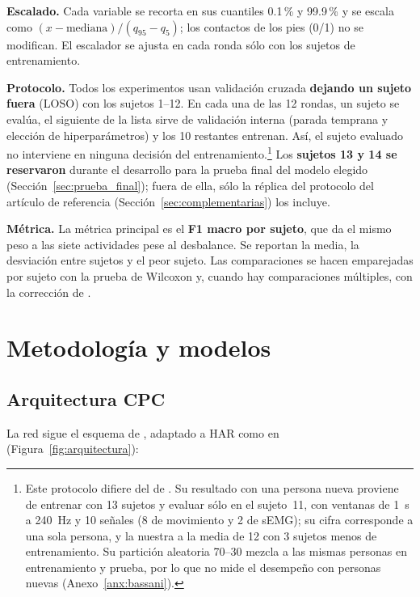 \documentclass[letterpaper,11pt]{article}
\begin{document}
\textbf{Escalado.} Cada variable se recorta en sus cuantiles 0.1\,\% y 99.9\,\% y se escala como $(x - \text{mediana})/(q_{95} - q_{5})$; los contactos de los pies (0/1) no se modifican. El escalador se ajusta en cada ronda sólo con los sujetos de entrenamiento.

\textbf{Protocolo.} Todos los experimentos usan validación cruzada \textbf{dejando un sujeto fuera} (LOSO) con los sujetos 1--12. En cada una de las 12 rondas, un sujeto se evalúa, el siguiente de la lista sirve de validación interna (parada temprana y elección de hiperparámetros) y los 10 restantes entrenan. Así, el sujeto evaluado no interviene en ninguna decisión del entrenamiento.\footnote{Este protocolo difiere del de \textcite{bassani2025}. Su resultado con una persona nueva proviene de entrenar con 13 sujetos y evaluar sólo en el sujeto~11, con ventanas de 1~s a 240~Hz y 10 señales (8 de movimiento y 2 de sEMG); su cifra corresponde a una sola persona, y la nuestra a la media de 12 con 3 sujetos menos de entrenamiento. Su partición aleatoria 70--30 mezcla a las mismas personas en entrenamiento y prueba, por lo que no mide el desempeño con personas nuevas (Anexo~\ref{anx:bassani}).} Los \textbf{sujetos 13 y 14 se reservaron} durante el desarrollo para la prueba final del modelo elegido (Sección~\ref{sec:prueba_final}); fuera de ella, sólo la réplica del protocolo del artículo de referencia (Sección~\ref{sec:complementarias}) los incluye.

\textbf{Métrica.} La métrica principal es el \textbf{F1 macro por sujeto}, que da el mismo peso a las siete actividades pese al desbalance. Se reportan la media, la desviación entre sujetos y el peor sujeto. Las comparaciones se hacen emparejadas por sujeto con la prueba de Wilcoxon \parencite{wilcoxon1945} y, cuando hay comparaciones múltiples, con la corrección de \textcite{holm1979}.

\section{Metodología y modelos}

\subsection{Arquitectura CPC}
\label{sec:cpc}
La red sigue el esquema de \textcite{vandenoord2018}, adaptado a HAR como en \textcite{haresamudram2021} (Figura~\ref{fig:arquitectura}):
\end{document}
